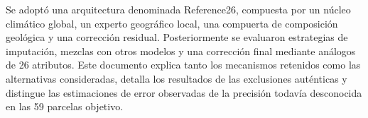 Se adoptó una arquitectura denominada Reference26, compuesta por un núcleo climático global, un experto geográfico local, una compuerta de composición geológica y una corrección residual. Posteriormente se evaluaron estrategias de imputación, mezclas con otros modelos y una corrección final mediante análogos de 26 atributos. Este documento explica tanto los mecanismos retenidos como las alternativas consideradas, detalla los resultados de las exclusiones auténticas y distingue las estimaciones de error observadas de la precisión todavía desconocida en las 59 parcelas objetivo.
